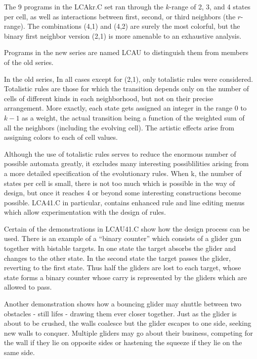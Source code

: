 The 9 programs in the LCAkr.C set ran through the $k$-range of 2, 3, 
and 4 states per cell, as well as interactions between first, second, 
or third neighbors (the $r$-range). The combinations (4,1) and (4,2) 
are surely the most colorful, but the binary first neighbor version 
(2,1) is more amenable to an exhaustive analysis.

Programs in the new series are named LCAU to distinguish them from 
members of the old series. 

In the old series, In all cases except for (2,1), only totalistic rules 
were considered. Totalistic rules are those for which the transition 
depends only on the number of cells of different kinds in each 
neighborhood, but not on their precise arrangement. More exactly, each 
state gets assigned an integer in the range 0 to $k-1$ as a weight, the 
actual transition being a function of the weighted sum of all the 
neighbors (including the evolving cell). The artistic effects arise 
from assigning colors to each of cell values. 

Although the use of totalistic rules serves to reduce the enormous 
number of possible automata greatly, it excludes many interesting 
possiblilities arising from a more detailed specification of the 
evolutionary rules. When k, the number of states per cell is small, 
there is not too much which is possible in the way of design, but once 
it reaches 4 or beyond some interesting constructions become possible. 
LCA41.C in particular, contains enhanced rule and line editing menus 
which allow experimentation with the design of rules.

Certain of the demonstrations in LCAU41.C show how the design process 
can be used. There is an example of a ``binary counter'' which consists 
of a glider gun together with bistable targets. In one state the target 
absorbs the glider and changes to the other state. In the second state 
the target passes the glider, reverting to the first state. Thus half 
the gliders are lost to each target, whose state forms a binary counter 
whose carry is represented by the gliders which are allowed to pass. 

Another demonstration shows how a bouncing glider may shuttle between 
two obstacles - still lifes - drawing them ever closer together. Just 
as the glider is about to be crushed, the walls coalesce but the glider 
escapes to one side, seeking new walls to conquer. Multiple gliders may 
go about their business, competing for the wall if they lie on opposite 
sides or hastening the squeeze if they lie on the same side.


